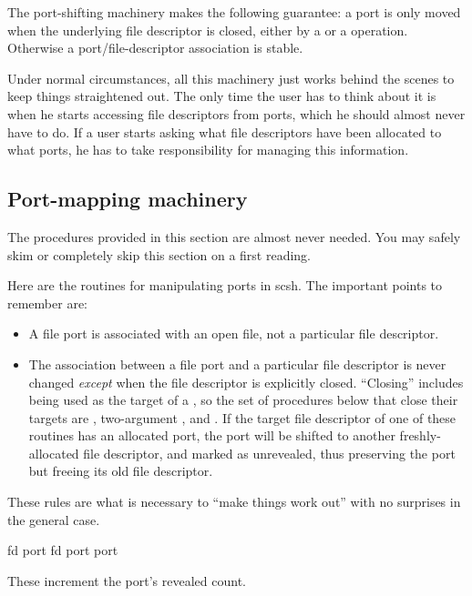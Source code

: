 The port-shifting machinery makes the following guarantee: a port is only
moved when the underlying file descriptor is closed, either by a 
or a  operation. Otherwise a port/file-descriptor association is
stable.

Under normal circumstances, all this machinery just works behind the scenes to
keep things straightened out. The only time the user has to think about it is
when he starts accessing file descriptors from ports, which he should almost
never have to do. If a user starts asking what file descriptors have been
allocated to what ports, he has to take responsibility for managing this
information.

\subsection{Port-mapping machinery}

The procedures provided in this section are almost never needed.
You may safely skim or completely skip this section on a first reading.

Here are the routines for manipulating ports in scsh. The important
points to remember are:
\begin{itemize}
    \item A file port is associated with an open file, not a particular file
      descriptor.
    \item The association between a file port and a particular file descriptor
      is never changed \emph{except} when the file descriptor is explicitly
      closed. ``Closing'' includes being used as the target of a , so
      the set of procedures below that close their targets are
      , two-argument , and .
      If the target file descriptor of one of these routines has an
      allocated port, the port will be shifted to another freshly-allocated
      file descriptor, and marked as unrevealed, thus preserving the port
      but freeing its old file descriptor.
\end{itemize}
These rules are what is necessary to ``make things work out'' with no
surprises in the general case.

  {fd} {port}
 {fd} {port}
  {port} {\fixnum}
\begin{desc}
    These increment the port's revealed count.
\end{desc}

